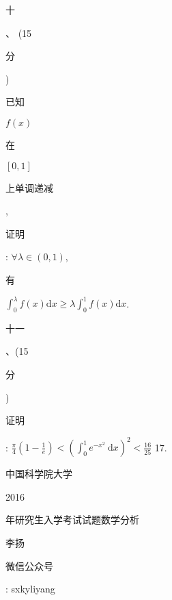 \documentclass[10pt]{article}
\begin{document}
\begin{CJK}{UTF8}{mj}十\end{CJK}、 (15 \begin{CJK}{UTF8}{mj}分\end{CJK}) \begin{CJK}{UTF8}{mj}已知\end{CJK} $f(x)$ \begin{CJK}{UTF8}{mj}在\end{CJK} $[0,1]$ \begin{CJK}{UTF8}{mj}上单调递减\end{CJK}, \begin{CJK}{UTF8}{mj}证明\end{CJK}: $\forall \lambda \in(0,1)$, \begin{CJK}{UTF8}{mj}有\end{CJK} $\int_{0}^{\lambda} f(x) \mathrm{d} x \geq \lambda \int_{0}^{1} f(x) \mathrm{d} x$.

\begin{CJK}{UTF8}{mj}十一\end{CJK}、(15 \begin{CJK}{UTF8}{mj}分\end{CJK}) \begin{CJK}{UTF8}{mj}证明\end{CJK}: $\frac{\pi}{4}\left(1-\frac{1}{e}\right)<\left(\int_{0}^{1} e^{-x^{2}} \mathrm{~d} x\right)^{2}<\frac{16}{25}$ 17. \begin{CJK}{UTF8}{mj}中国科学院大学\end{CJK} 2016 \begin{CJK}{UTF8}{mj}年研究生入学考试试题数学分析\end{CJK}

\begin{CJK}{UTF8}{mj}李扬\end{CJK}

\begin{CJK}{UTF8}{mj}微信公众号\end{CJK}: sxkyliyang
\end{document}
